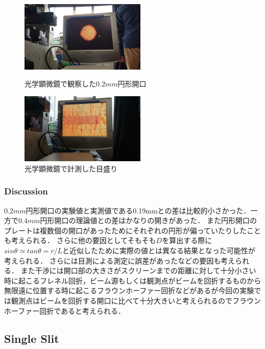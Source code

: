 \documentclass[11pt, a4paper]{jsarticle}
\begin{document}
\begin{figure}[htbp]
 \begin{minipage}{0.45\hsize}
  \begin{center}
   \includegraphics[width=60mm]{fig26.png}
  \end{center}
  \caption{光学顕微鏡で観察した$0.2mm$円形開口}
  \label{fig:26}
 \end{minipage}
 \begin{minipage}{0.45\hsize}
  \begin{center}
   \includegraphics[width=60mm]{fig27.png}
  \end{center}
  \caption{光学顕微鏡で計測した目盛り}
  \label{fig:27}
 \end{minipage}
\end{figure}
\subsubsection{Discussion}
$0.2mm$円形開口の実験値と実測値である0.19mmとの差は比較的小さかった．一方で$0.4mm$円形開口の理論値との差はかなりの開きがあった．
また円形開口のプレートは複数個の開口があったためにそれぞれの円形が偏っていたりしたことも考えられる．
さらに他の要因としてそもそも$D$を算出する際に$sin\theta \simeq tan\theta = r/L$と近似したために実際の値とは異なる結果となった可能性が考えられる．
さらには目測による測定に誤差があったなどの要因も考えられる．
また干渉には開口部の大きさがスクリーンまでの距離に対して十分小さい時に起こるフレネル回折，ビーム源もしくは観測点がビームを回折するものから無限遠に位置する時に起こるフラウンホーファー回折などがあるが今回の実験では観測点はビームを回折する開口に比べて十分大きいと考えられるのでフラウンホーファー回折であると考えられる．
\subsection{Single Slit}
\end{document}
